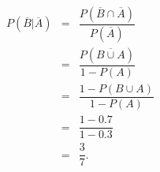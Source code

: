 \emptybox{15cm}

\begin{solution}
\begin{eqnarray*}
   P(\overline{B}|\overline{A})      &=&  \dfrac{P(\overline{B}\cap \overline{A})}{P(\overline{A})}\\
                                    &=&  \dfrac{P(\overline{B\cup A})}{1-P(A)}\\
                                    &=&  \dfrac{1-P(B\cup A)}{1-P(A)}\\
                                    &=&  \dfrac{1-0.7}{1-0.3}\\
                                    &=&  \dfrac{3}{7} .
\end{eqnarray*}
\end{solution}




\newpage